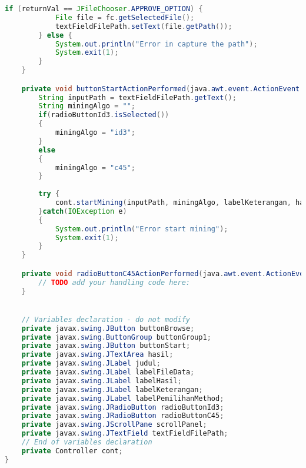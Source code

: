 \begin{lstlisting}[language=Java,basicstyle=\tiny,caption=View.java]
        if (returnVal == JFileChooser.APPROVE_OPTION) {
            File file = fc.getSelectedFile();
            textFieldFilePath.setText(file.getPath());
        } else {
            System.out.println("Error in capture the path");
            System.exit(1);
        }
    }                                            

    private void buttonStartActionPerformed(java.awt.event.ActionEvent evt) {                                            
        String inputPath = textFieldFilePath.getText();
        String miningAlgo = "";
        if(radioButtonId3.isSelected())
        {
            miningAlgo = "id3";
        }
        else
        {
            miningAlgo = "c45";
        }
        
        try {
            cont.startMining(inputPath, miningAlgo, labelKeterangan, hasil);
        }catch(IOException e)
        {
            System.out.println("Error start mining");
            System.exit(1);
        }
    }                                           

    private void radioButtonC45ActionPerformed(java.awt.event.ActionEvent evt) {                                               
        // TODO add your handling code here:
    }                                              


    // Variables declaration - do not modify                     
    private javax.swing.JButton buttonBrowse;
    private javax.swing.ButtonGroup buttonGroup1;
    private javax.swing.JButton buttonStart;
    private javax.swing.JTextArea hasil;
    private javax.swing.JLabel judul;
    private javax.swing.JLabel labelFileData;
    private javax.swing.JLabel labelHasil;
    private javax.swing.JLabel labelKeterangan;
    private javax.swing.JLabel labelPemilihanMethod;
    private javax.swing.JRadioButton radioButtonId3;
    private javax.swing.JRadioButton radioButtonC45;
    private javax.swing.JScrollPane scrollPanel;
    private javax.swing.JTextField textFieldFilePath;
    // End of variables declaration                   
    private Controller cont;
}

\end{lstlisting}


